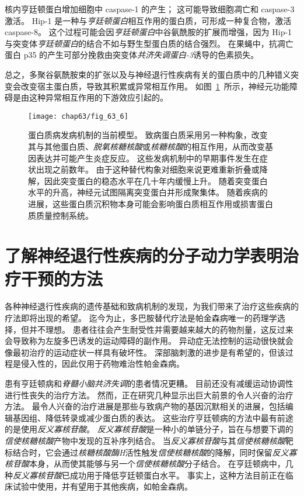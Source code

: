 核内亨廷顿蛋白增加细胞中 caspase-1 的产生；
这可能导致细胞凋亡和 caspase-3 激活。
Hip-1 是一种与\textit{亨廷顿蛋白}相互作用的蛋白质，可形成一种复合物，激活 caspase-8。
这个过程可能会因\textit{亨廷顿蛋白}中谷氨酰胺的扩展而增强，因为 Hip-1 与突变体\textit{亨廷顿蛋白}的结合不如与野生型蛋白质的结合强烈。
在果蝇中，抗凋亡蛋白 p35 的产生可部分挽救由突变体\textit{共济失调蛋白-3}诱导的色素损失。


总之，多聚谷氨酰胺束的扩张以及与神经退行性疾病有关的蛋白质中的几种错义突变会改变宿主蛋白质，导致其积累或异常相互作用。
如图~\ref{fig:63_6}~所示，神经元功能障碍是由这种异常相互作用的下游效应引起的。


\begin{figure}[htbp]
	\centering
	\texttt{[image: chap63/fig\_63\_6]}
	\caption{蛋白质病发病机制的当前模型。
		致病蛋白质采用另一种构象，改变其与其他蛋白质、\textit{脱氧核糖核酸}或\textit{核糖核酸}的相互作用，从而改变基因表达并可能产生炎症反应。
		这些发病机制中的早期事件发生在症状出现之前数年。
		由于这种替代构象对细胞来说更难重新折叠或降解，因此突变蛋白的稳态水平在几十年内缓慢上升。
		随着突变蛋白水平的升高，神经元试图隔离突变蛋白并形成聚集体。
		随着疾病的进展，这些蛋白质沉积物本身可能会影响蛋白质相互作用或损害蛋白质质量控制系统。}
	\label{fig:63_6}
\end{figure}



\section{了解神经退行性疾病的分子动力学表明治疗干预的方法}

各种神经退行性疾病的遗传基础和致病机制的发现，为我们带来了治疗这些疾病的疗法即将出现的希望。
迄今为止，多巴胺替代疗法是帕金森病唯一的药理学选择，但并不理想。
患者往往会产生耐受性并需要越来越大的药物剂量，这反过来会导致称为左旋多巴诱发的运动障碍的副作用。
异动症无法控制的运动很快就会像最初治疗的运动症状一样具有破坏性。
深部脑刺激的进步是有希望的，但该过程是侵入性的，因此仅用于药物难治性帕金森病。


患有亨廷顿病和\textit{脊髓小脑共济失调}的患者情况更糟。
目前还没有减缓运动协调性进行性丧失的治疗方法。
然而，正在研究几种显示出巨大前景的令人兴奋的治疗方法。
最令人兴奋的治疗进展是那些与致病产物的基因沉默相关的进展，包括编辑基因组、降低转录或减少蛋白质的表达。
这些治疗亨廷顿病的方法中最有前途的是使用\textit{反义寡核苷酸}。
\textit{反义寡核苷酸}是一种小的单链分子，旨在与想要下调的\textit{信使核糖核酸}产物中发现的互补序列结合。
当\textit{反义寡核苷酸}与其\textit{信使核糖核酸}靶标结合时，它会通过\textit{核糖核酸酶H}活性触发\textit{信使核糖核酸}的降解，同时保留\textit{反义寡核苷酸}本身，从而使其能够与另一个\textit{信使核糖核酸}分子结合。
在亨廷顿病中，几种\textit{反义寡核苷酸}已成功用于降低亨廷顿蛋白水平。
事实上，这种方法目前正在临床试验中使用，并有望用于其他疾病，如帕金森病。


